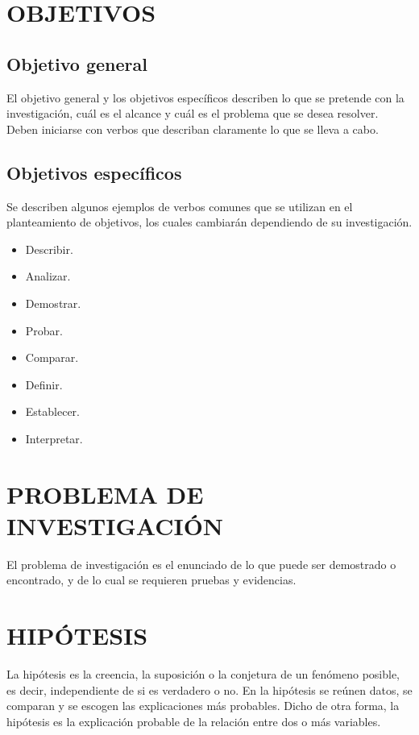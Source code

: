 \newpage
\section{OBJETIVOS}

\subsection{Objetivo general}

El objetivo general y los objetivos específicos describen lo que se pretende con la investigación, cuál es el alcance y cuál es el problema que se desea resolver. Deben iniciarse con verbos que describan claramente lo que se lleva a cabo.

\subsection{Objetivos específicos}

Se describen algunos ejemplos de verbos comunes que se utilizan en el planteamiento de objetivos, los cuales cambiarán dependiendo de su investigación.

\begin{itemize}
    \item Describir.
    \item Analizar.
    \item Demostrar.
    \item Probar.
    \item Comparar.
    \item Definir.
    \item Establecer.
    \item Interpretar.
\end{itemize}

\newpage
\section{PROBLEMA DE INVESTIGACIÓN}

El problema de investigación es el enunciado de lo que puede ser demostrado o encontrado, y de lo cual se requieren pruebas y evidencias.

\newpage
\section{HIPÓTESIS}

La hipótesis es la creencia, la suposición o la conjetura de un fenómeno posible, es decir, independiente de si es verdadero o no. En la hipótesis se reúnen datos, se comparan y se escogen las explicaciones más probables. Dicho de otra forma, la hipótesis es la explicación probable de la relación entre dos o más variables.

